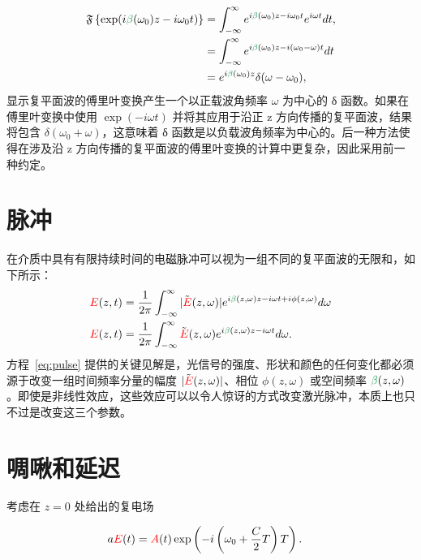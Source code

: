 \begin{align}
    \FT\left\{\exp(i\betag(\omega_0)z-i\omega_0 t)\right\} &= \int_{-\infty}^{\infty} e^{i\betag(\omega_0)z-i\omega_0 t} e^{i\omega t} dt, \\ \nonumber
      &= \int_{-\infty}^{\infty} e^{i\betag(\omega_0)z-i(\omega_0-\omega) t} dt \\ \nonumber
      &= e^{i\betag(\omega_0)z}\delta(\omega-\omega_0),
\end{align} 
显示复平面波的傅里叶变换产生一个以正载波角频率 $\omega$ 为中心的 δ 函数。如果在傅里叶变换中使用 $\exp(-i\omega t)$ 并将其应用于沿正 z 方向传播的复平面波，结果将包含 $\delta(\omega_0+\omega)$，这意味着 δ 函数是以负载波角频率为中心的。后一种方法使得在涉及沿 z 方向传播的复平面波的傅里叶变换的计算中更复杂，因此采用前一种约定。

\section{脉冲}
在介质中具有有限持续时间的电磁脉冲可以视为一组不同的复平面波的无限和，如下所示：
\begin{align}
    \label{eq:pulse}
    \E(z,t) &= \frac{1}{2\pi}\int_{-\infty}^{\infty} |\Tilde{\E}(z,\omega)| e^{i\betag(z,\omega)z-i\omega t+i\phi(z,\omega)} d\omega \\ \nonumber
    \E(z,t) &= \frac{1}{2\pi}\int_{-\infty}^{\infty} \Tilde{\E}(z,\omega) e^{i\betag(z,\omega)z-i\omega t} d\omega.
\end{align}
方程~\ref{eq:pulse} 提供的关键见解是，光信号的强度、形状和颜色的任何变化都必须源于改变一组时间频率分量的幅度 $|\Tilde{\textcolor{red}{E}}(z,\omega)|$、相位 $\phi(z,\omega)$ 或空间频率 $\betag(z,\omega)$。即使是非线性效应，这些效应可以以令人惊讶的方式改变激光脉冲，本质上也只不过是改变这三个参数。


\section{啁啾和延迟}
考虑在 $z=0$ 处给出的复电场

\begin{align}
\label{eq:chirp_example}
    a\textcolor{red}{E}(t) &= \textcolor{red}{A}(t)\exp\left(  -i\left(\omega_0 +\frac{C}{2}T \right)T   \right).
\end{align}

